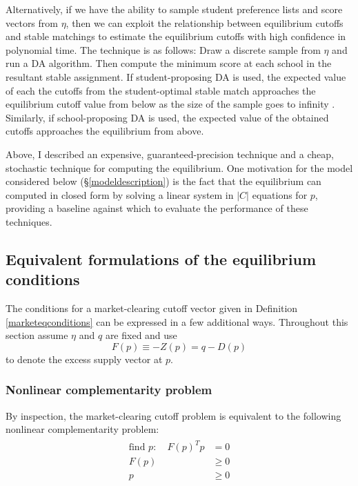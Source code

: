 \documentclass[12pt]{article}
\theoremstyle{definition}
\begin{document}
Alternatively, if we have the ability to sample student preference lists and score vectors from $\eta$, then we can exploit the relationship between equilibrium cutoffs and stable matchings to estimate the equilibrium cutoffs with high confidence in polynomial time. The technique is as follows: Draw a discrete sample from $\eta$ and run a DA algorithm. Then compute the minimum score at each school in the resultant stable assignment. If student-proposing DA is used, the expected value of each the cutoffs from the student-optimal stable match approaches the equilibrium cutoff value from below as the size of the sample goes to infinity \parencite[][]{supplydemandfw}. Similarly, if school-proposing DA is used, the expected value of the obtained cutoffs approaches the equilibrium from above. 

Above, I described an expensive, guaranteed-precision technique and a cheap, stochastic technique for computing the equilibrium. One motivation for the model considered below (\S\ref{modeldescription}) is the fact that the equilibrium can computed in closed form by solving a linear system in $|C|$ equations for $p$, providing a baseline against which to evaluate the performance of these techniques. 

\subsection{Equivalent formulations of the equilibrium conditions}
The conditions for a market-clearing cutoff vector given in Definition \ref{marketeqconditions} can be expressed in a few additional ways. Throughout this section assume $\eta$ and $q$ are fixed and use \[F(p) \equiv -Z(p) = q - D(p)\]
to denote the excess supply vector at $p$. 

\subsubsection{Nonlinear complementarity problem}
By inspection, the market-clearing cutoff problem is equivalent to the following nonlinear complementarity problem:
\begin{gather} \label{nonlinearcompprob}
\begin{aligned}
\text{find } p:\quad F(p)^T p & = 0 \\ F(p) &\geq 0 \\ p & \geq 0
\end{aligned}
\end{gather}
\end{document}
